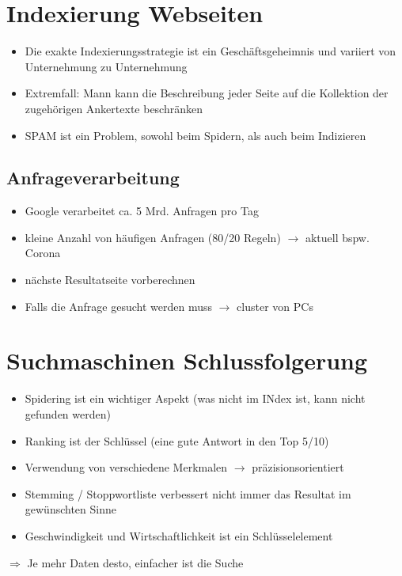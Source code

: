 \documentclass{report}
\theoremstyle{definition}
\theoremstyle{example}
\begin{document}
\section{Indexierung Webseiten}
\begin{itemize}
   \item Die exakte Indexierungsstrategie ist ein Geschäftsgeheimnis und variiert von Unternehmung zu Unternehmung
   \item Extremfall: Mann kann die Beschreibung jeder Seite auf die Kollektion der zugehörigen Ankertexte beschränken
   \item SPAM ist ein Problem, sowohl beim Spidern, als auch beim Indizieren
\end{itemize}

\subsection{Anfrageverarbeitung}
\begin{itemize}
   \item Google verarbeitet ca. 5 Mrd. Anfragen pro Tag
   \item kleine Anzahl von häufigen Anfragen (80/20 Regeln) $\rightarrow$ aktuell bspw. Corona
   \item nächste Resultatseite vorberechnen
   \item Falls die Anfrage gesucht werden muss $\rightarrow$ cluster von PCs
\end{itemize}

\section{Suchmaschinen Schlussfolgerung}
\begin{itemize}
   \item Spidering ist ein wichtiger Aspekt (was nicht im INdex ist, kann nicht gefunden werden)
   \item Ranking ist der Schlüssel (eine gute Antwort in den Top 5/10)
   \item Verwendung von verschiedene Merkmalen $\rightarrow$ präzisionsorientiert
   \item Stemming / Stoppwortliste verbessert nicht immer das Resultat im gewünschten Sinne
   \item Geschwindigkeit und Wirtschaftlichkeit ist ein Schlüsselelement
\end{itemize}

$\Rightarrow$ Je mehr Daten desto, einfacher ist die Suche
\end{document}
